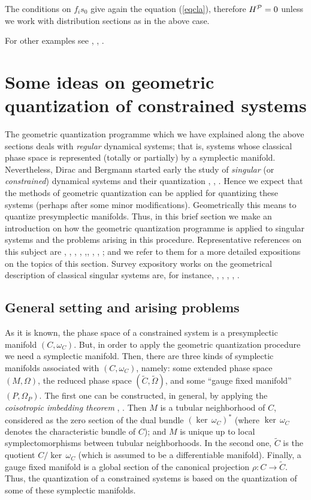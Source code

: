 \documentclass[12pt]{article}
\theoremstyle{plain}
\def\rps{(\tilde C,\tilde\Omega )}
\begin{document}
The conditions on $f_is_0$ give again the equation (\ref{eqcla}),
therefore $H^{\cal P}=0$ unless we work with distribution sections as in
the above case.

For other examples see \cite{Sn-80}, \cite{Tu-85}, \cite{Wo-80}.




\section{Some ideas on geometric quantization of constrained systems}


The geometric quantization programme  which we have explained along the
above sections
deals with {\it regular} dynamical systems; that is,
systems whose classical phase space is represented
(totally or partially) by a symplectic manifold.
Nevertheless, Dirac and Bergmann started early the study of
{\it singular} (or {\it constrained}) dynamical systems
and their quantization \cite{BG-tps}, \cite{Di-rmp}, \cite{Di-lqm}.
Hence we expect that the methods of geometric quantization can
be applied for quantizing these systems (perhaps after some minor
modifications).
Geometrically this means to quantize presymplectic manifolds.
Thus, in this brief section we make an introduction on how
the geometric quantization programme is applied
to singular systems and the problems arising in this procedure.
Representative references on this subject are
\cite{AS-86}, \cite{Blau-88a}, \cite{Blau-88b}, \cite{Go-86},
\cite{GS-81},\cite{Lo-90}, \cite{Ml-89}, \cite{Sn-83}, \cite{Tu-91};
and we refer to them for a more detailed expositions on the topics of
this section.
Survey expository works on the geometrical description of classical
singular systems are, for instance,
\cite{BK-ymtcs}, \cite{Ca-tsl}, \cite{GNH-pca}, \cite{GP-ggf},
\cite{MR-gs}.



\subsection{General setting and arising problems}


As it is known,  the phase space of a constrained system is a
presymplectic manifold $(C,\omega_C)$. But, in order to apply the
geometric quantization procedure we need a symplectic manifold.
Then, there are three kinds of symplectic manifolds associated
with $(C,\omega_C)$, namely: some extended phase space $(M,\Omega
)$, the reduced phase space $\rps$, and some ``gauge fixed
manifold'' $(P,\Omega_P)$. The first one can be constructed, in
general, by applying the {\it coisotropic imbedding theorem}
\cite{Go-cit}, \cite{Ma-src}. Then $M$ is a tubular neighborhood
of $C$, considered as the zero section of the dual bundle
$(\ker\,\omega_C)^*$ (where $\ker\,\omega_C$ denotes the
characteristic bundle of $C$); and $M$ is unique up to local
symplectomorphisms between tubular neighborhoods. In the second
one, $\tilde C$ is the quotient $C/\ker\,\omega_C$ (which is
assumed to be a differentiable manifold). Finally, a gauge fixed
manifold is a global section of the canonical projection
$\rho\colon C\to\tilde C$. Thus, the quantization of a constrained
systems is based on the quantization of some of these symplectic
manifolds.
\end{document}
